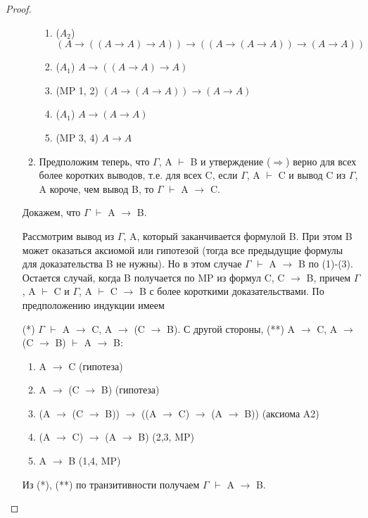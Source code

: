 \documentclass[a4paper]{article}
\theoremstyle{definition}
\theoremstyle{remark}
\begin{document}
\begin{proof}
\begin{itemize}
\begin{enumerate}
\begin{enumerate}
                        \item ($A_2$) $(A\rightarrow ((A\rightarrow A)\rightarrow A))\rightarrow ((A\rightarrow (A\rightarrow A))\rightarrow (A \rightarrow A))$ 
                        \item ($A_1$) $A\rightarrow ((A\rightarrow A)\rightarrow A)$ 
                        \item (MP 1, 2) $(A\rightarrow(A\rightarrow A))\rightarrow(A\rightarrow A)$
                        \item ($A_1$) $A\rightarrow (A\rightarrow A)$ 
                        \item (MP 3, 4) $A\rightarrow A$
                    \end{enumerate}
                \item Предположим теперь, что $\Gamma$, A $\vdash$ B и утверждение ($\Rightarrow$) верно для
                всех более коротких выводов, т.е.
                для всех C, если $\Gamma$, A $\vdash$ C и вывод C из $\Gamma$, A короче, чем вывод B, то
                $\Gamma$ $\vdash$ A $\rightarrow$ C.
            \end{enumerate}
            Докажем, что $\Gamma$ $\vdash$ A $\rightarrow$ B.
            
            Рассмотрим вывод из $\Gamma$, A, который заканчивается формулой B. При
            этом B может оказаться аксиомой или гипотезой (тогда все предыдущие
            формулы для доказательства B не нужны). Но в этом случае $\Gamma$ $\vdash$ A $\rightarrow$ B
            по (1)-(3).
            Остается случай, когда B получается по MP из формул C, C $\rightarrow$ B, причем $\Gamma$, A $\vdash$ C и $\Gamma$, A $\vdash$ C $\rightarrow$ B с более короткими доказательствами. По
            предположению индукции имеем
            
            (*) $\Gamma$ $\vdash$ A $\rightarrow$ C, A $\rightarrow$ (C $\rightarrow$ B).
            С другой стороны,
            (**) A $\rightarrow$ C, A $\rightarrow$ (C $\rightarrow$ B) $\vdash$ A $\rightarrow$ B:
            \begin{enumerate}
                \item A $\rightarrow$ C (гипотеза)
                \item A $\rightarrow$ (C $\rightarrow$ B) (гипотеза)
                \item (A $\rightarrow$ (C $\rightarrow$ B)) $\rightarrow$ ((A $\rightarrow$ C) $\rightarrow$ (A $\rightarrow$ B)) (аксиома A2)
                \item (A $\rightarrow$ C) $\rightarrow$ (A $\rightarrow$ B) (2,3, MP)
                \item A $\rightarrow$ B (1,4, MP)
            \end{enumerate}
            Из (*), (**) по транзитивности получаем $\Gamma$ $\vdash$ A $\rightarrow$ B.
        \end{itemize}
    \end{proof}
\end{document}
